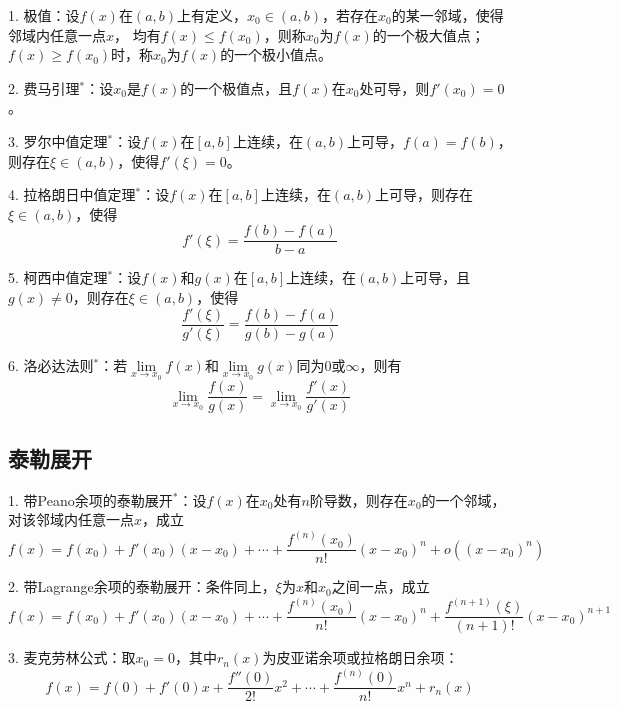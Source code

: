 1. 极值：设$f(x)$在$(a,b)$上有定义，$x_0\in(a,b)$，若存在$x_0$的某一邻域，使得邻域内任意一点$x$，
均有$f(x)\leqslant f(x_0)$，则称$x_0$为$f(x)$的一个极大值点；$f(x)\geqslant f(x_0)$时，称$x_0$为$f(x)$的一个极小值点。

2. 费马引理$^*$：设$x_0$是$f(x)$的一个极值点，且$f(x)$在$x_0$处可导，则$f'(x_0)=0$。

3. 罗尔中值定理$^*$：设$f(x)$在$[a,b]$上连续，在$(a,b)$上可导，$f(a)=f(b)$，则存在$\xi \in (a,b)$，使得$f'(\xi)=0$。

4. 拉格朗日中值定理$^*$：设$f(x)$在$[a,b]$上连续，在$(a,b)$上可导，则存在$\xi \in (a,b)$，使得
\begin{equation*}
    f'(\xi)=\frac{f(b)-f(a)}{b-a}
\end{equation*}

5. 柯西中值定理$^*$：设$f(x)$和$g(x)$在$[a,b]$上连续，在$(a,b)$上可导，且$g(x)\neq 0$，则存在$\xi \in (a,b)$，使得
\begin{equation*}
    \frac{f'(\xi)}{g'(\xi)}=\frac{f(b)-f(a)}{g(b)-g(a)}
\end{equation*}

6. 洛必达法则$^*$：若$\lim\limits_{x\rightarrow x_0} f(x)$和$\lim\limits_{x\rightarrow x_0} g(x)$同为$0$或$\infty$，则有
\begin{equation*}
    \lim\limits_{x\rightarrow x_0} \frac{f(x)}{g(x)}=\lim\limits_{x\rightarrow x_0} \frac{f'(x)}{g'(x)}
\end{equation*}

\subsection{泰勒展开}

1. 带Peano余项的泰勒展开$^*$：设$f(x)$在$x_0$处有$n$阶导数，则存在$x_0$的一个邻域，对该邻域内任意一点$x$，成立
\begin{equation*}
    f(x)=f(x_0)+f'(x_0)(x-x_0)+\cdots+\frac{f^{(n)}(x_0)}{n!}(x-x_0)^n+o\left((x-x_0)^n\right)
\end{equation*}

2. 带Lagrange余项的泰勒展开：条件同上，$\xi$为$x$和$x_0$之间一点，成立
\begin{equation*}
    f(x)=f(x_0)+f'(x_0)(x-x_0)+\cdots+\frac{f^{(n)}(x_0)}{n!}(x-x_0)^n+\frac{f^{(n+1)}(\xi)}{(n+1)!}(x-x_0)^{n+1}
\end{equation*}

3. 麦克劳林公式：取$x_0=0$，其中$r_n(x)$为皮亚诺余项或拉格朗日余项：
\begin{equation*}
    f(x)=f(0)+f'(0)x+\frac{f''(0)}{2!}x^2+\cdots+\frac{f^{(n)}(0)}{n!}x^n+r_n(x)
\end{equation*}

